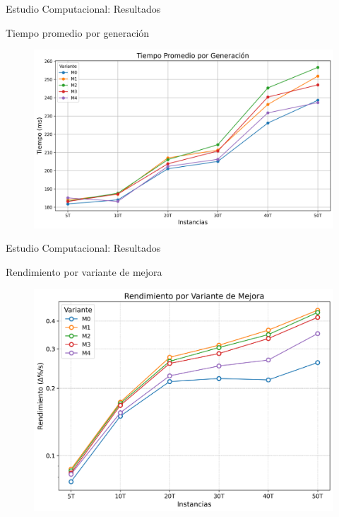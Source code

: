 \documentclass[handout]{beamer}
\begin{document}
\begin{frame}{Estudio Computacional: Resultados}
    \begin{exampleblock}{Tiempo promedio por generación}
        \begin{figure}
            \centering
            \includegraphics[width=0.8\linewidth]{pic/exp-tiempo-por-generacion.png}
        \end{figure}
    \end{exampleblock}
\end{frame}

\begin{frame}{Estudio Computacional: Resultados}
    \begin{exampleblock}{Rendimiento por variante de mejora}
        \begin{figure}
            \centering
            \includegraphics[width=0.8\linewidth]{pic/exp-rendimiento.png}
        \end{figure}
    \end{exampleblock}
\end{frame}
\end{document}
